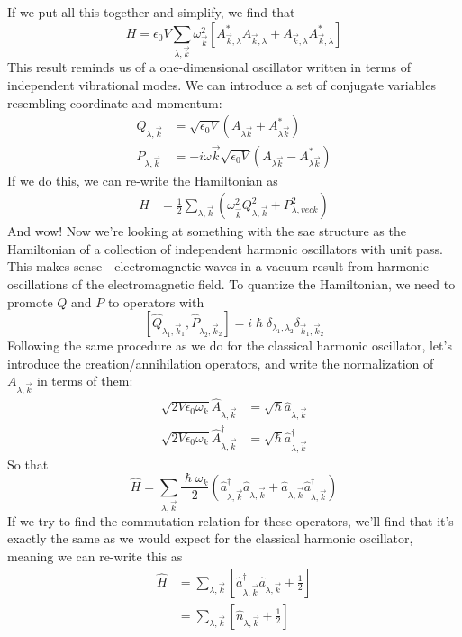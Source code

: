 \documentclass[a4paper]{article}
\begin{document}
If we put all this together and simplify, we find that
\[
	H = \epsilon_0 V \sum_{\lambda,\vec{k}}\omega_{\vec{k}}^2
	[
		A^\ast_{\vec{k},\lambda} A_{\vec{k},\lambda} +
		A_{\vec{k},\lambda} A^\ast_{\vec{k},\lambda}
	]
\]
This result reminds us of a one-dimensional oscillator written in terms of
independent vibrational modes. We can introduce a set of conjugate variables
resembling coordinate and momentum:
\begin{align*}
	Q_{\lambda,\vec{k}} &= \sqrt{\epsilon_0V}
		(A_{\lambda\vec{k}} + A^\ast_{\lambda\vec{k}})\\
	P_{\lambda,\vec{k}} &= -i\omega\vec{k} \sqrt{\epsilon_0V}
		(A_{\lambda\vec{k}} - A^\ast_{\lambda\vec{k}})
\end{align*}
If we do this, we can re-write the Hamiltonian as
\begin{align*}
	H &= \frac{1}{2} \sum_{\lambda,\vec{k}}
	\left(
		\omega_{\vec{k}}^2 Q_{\lambda,\vec{k}}^2 +
		P_{\lambda,vec{k}}^2
	\right)
\end{align*}
And wow! Now we're looking at something with the sae structure as the
Hamiltonian of a collection of independent harmonic oscillators with unit pass.
This makes sense---electromagnetic waves in a vacuum result from harmonic
oscillations of the electromagnetic field. To quantize the Hamiltonian, we need
to promote $Q$ and $P$ to operators with
\[
	[\hat{Q}_{\lambda_1,\vec{k}_1}, \hat{P}_{\lambda_2,\vec{k}_2}] =
	i\hslash\delta_{\lambda_1,\lambda_2}\delta_{\vec{k}_1,\vec{k}_2}
\]
Following the same procedure as we do for the classical harmonic oscillator,
let's introduce the creation/annihilation operators, and write the
normalization of $A_{\lambda,\vec{k}}$ in terms of them:
\begin{align*}
	\sqrt{2V\epsilon_0\omega_k} \hat{A}_{\lambda,\vec{k}} &=
		\sqrt{\hslash}\hat{a}_{\lambda,\vec{k}}\\
	\sqrt{2V\epsilon_0\omega_k} \hat{A}^\dagger_{\lambda,\vec{k}} &=
		\sqrt{\hslash}\hat{a}^\dagger_{\lambda,\vec{k}}
\end{align*}
So that
\[
	\hat{H} = \sum_{\lambda,\vec{k}} \frac{\hslash\omega_k}{2}
	(
		\hat{a}^\dagger_{\lambda,\vec{k}}\hat{a}_{\lambda,\vec{k}} +
		\hat{a}_{\lambda,\vec{k}}\hat{a}^\dagger_{\lambda,\vec{k}}
	)
\]
If we try to find the commutation relation for these operators, we'll find that
it's exactly the same as we would expect for the classical harmonic oscillator,
meaning we can re-write this as
\begin{align*}
	\hat{H} &= \sum_{\lambda,\vec{k}}
	\left[
		\hat{a}^\dagger_{\lambda,\vec{k}}\hat{a}_{\lambda,\vec{k}}
		+ \frac{1}{2}
	\right]\\
	&= \sum_{\lambda,\vec{k}}
	\left[
		\hat{n}_{\lambda,\vec{k}} + \frac{1}{2}
	\right]
\end{align*}
\end{document}
